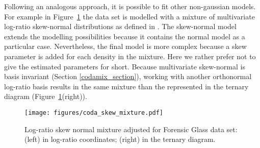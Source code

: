 \documentclass[12pt, a4paper]{article}
\begin{document}
Following an analogous approach, it is possible to fit other non-gaussian models. For example in Figure~\ref{skewcodadist} the data set is modelled with a mixture of multivariate log-ratio skew-normal distributions as defined in \cite{prates2013mixsmsn}. The skew-normal model extends the modelling possibilities because it contains the normal model as a particular case. Nevertheless, the final model is more complex because a skew parameter is added for each density in the mixture. Here we rather prefer not to give the estimated parameters for short. Because multivariate skew-normal is basis invariant  (Section \ref{codamix_section}), working with another orthonormal log-ratio basis results in the same mixture than the represented in the ternary diagram (Figure~\ref{skewcodadist}(right)). 

\begin{figure}[htbp]
\centering
\texttt{[image: figures/coda\_skew\_mixture.pdf]}\\%
\caption{Log-ratio skew normal mixture adjusted for Forensic Glass data set: (left) in log-ratio coordinates; (right) in the ternary diagram.}
\label{skewcodadist}
\end{figure}


% 
\end{document}
